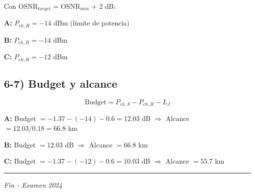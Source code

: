 \documentclass[a4paper,11pt]{article}
\begin{document}
Con OSNR$_{target}$ = OSNR$_{min}$ + 2 dB:

\textbf{A:} $P_{ch,R} = -14$ dBm (límite de potencia)

\textbf{B:} $P_{ch,R} = -14$ dBm

\textbf{C:} $P_{ch,R} = -12$ dBm

\subsection*{6-7) Budget y alcance}

$$\text{Budget} = P_{ch,S} - P_{ch,R} - L_J$$

\textbf{A:} Budget $= -1.37 - (-14) - 0.6 = 12.03$ dB $\Rightarrow$ Alcance $= 12.03/0.18 = 66.8$ km

\textbf{B:} Budget $= 12.03$ dB $\Rightarrow$ Alcance $= 66.8$ km

\textbf{C:} Budget $= -1.37 - (-12) - 0.6 = 10.03$ dB $\Rightarrow$ Alcance $= 55.7$ km

\vspace{1cm}
\noindent\rule{\textwidth}{0.4pt}
\begin{center}
\textit{Fin - Examen 2024}
\end{center}
\end{document}
